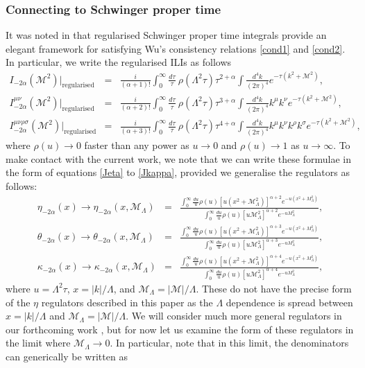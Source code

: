 \documentclass[12pt, letter]{article}
\newcommand{\M}{\mathcal{M}}
\begin{document}
\subsubsection{Connecting to Schwinger proper time} \label{sec:SPT}
It was noted in \cite{Xing:2022jtt} that regularised Schwinger proper time integrals  provide an elegant framework for satisfying Wu's consistency relations \eqref{cond1} and \eqref{cond2}.  In particular, we write the regularised ILIs as follows
\begin{eqnarray}
I_{-2\alpha} (\M^2)|_\text{regularised}&=& \frac{i}{(\alpha+1)!} \int_0^\infty \frac{d\tau}{\tau} \ \rho(\Lambda^2 \tau)  \tau^{2 + \alpha} \int \frac{d^4 k}{(2 \pi)^4}  e^{-\tau (k^2+\M^2)}, \label{ILIs1ST} \\ 
I_{-2 \alpha}^{ \mu \nu} (\M^2) |_\text{regularised}&=& \frac{i}{(\alpha+2)!} \int_0^\infty \frac{d\tau}{\tau} \ \rho(\Lambda^2 \tau)  \tau^{3 + \alpha} \int \frac{d^4 k}{(2 \pi)^4}  k^\mu k^\nu e^{-\tau (k^2+\M^2)}, \label{ILIs2ST} \\ 
I_{-2 \alpha}^{\mu \nu \rho \sigma} (\M^2) |_\text{regularised}&=&  \frac{i}{(\alpha+3)!} \int_0^\infty \frac{d\tau}{\tau} \ \rho(\Lambda^2 \tau)  \tau^{4 + \alpha} \int \frac{d^4 k}{(2 \pi)^4}  k^{\mu}k^{\nu}k^{\rho}k^{\sigma} e^{-\tau (k^2+\M^2)},\quad
 \label{ILIs3ST}
\end{eqnarray}
where  $\rho(u) \to 0$ faster than any power as $u\to 0$ and $\rho(u) \to 1$ as $u \to \infty$. To make contact with the current work, we note that we can write these formulae in the form of equations \eqref{Jeta} to \eqref{Jkappa}, provided we generalise the regulators as follows:
\begin{eqnarray}
\eta_{-2\alpha}(x) \to \eta_{-2\alpha}(x, \M_\Lambda)&=&\frac{\int_0^\infty \frac{du}{u} \rho(u) [u(x^2+\M_\Lambda^2)]^{\alpha+2} e^{-u(x^2+M_\Lambda^2)}}{\int_0^\infty\frac{du}{u} \rho(u) [u\M_\Lambda^2]^{\alpha+2} e^{-u M_\Lambda^2}}, \\
\theta_{-2\alpha}(x) \to \theta_{-2\alpha}(x, \M_\Lambda)&=&\frac{\int_0^\infty \frac{du}{u} \rho(u) [u(x^2+\M_\Lambda^2)]^{\alpha+3} e^{-u(x^2+M_\Lambda^2)}}{\int_0^\infty \frac{du}{u} \rho(u) [u\M_\Lambda^2]^{\alpha+3} e^{-u M_\Lambda^2}}, \\
\kappa_{-2\alpha}(x) \to \kappa_{-2\alpha}(x, \M_\Lambda)&=&\frac{\int_0^\infty \frac{du}{u} \rho(u) [u(x^2+\M_\Lambda^2)]^{\alpha+4} e^{-u(x^2+M_\Lambda^2)}}{\int_0^\infty  \frac{du}{u} \rho(u) [u\M_\Lambda^2]^{\alpha+4} e^{-u M_\Lambda^2}},
\end{eqnarray} 
where $u=\Lambda^2 \tau$,  $x=|k|/\Lambda$, and $\M_\Lambda=|\M|/\Lambda$.  These do not have the precise form of the $\eta$ regulators described in this paper as the $\Lambda$ dependence is spread between  $x=|k|/\Lambda$ and $\M_\Lambda=|\M|/\Lambda$. We will consider much more general regulators in our forthcoming work \cite{PadillaSmith23}, but for now let us examine the form of these regulators in the limit where $\M_\Lambda \to 0$.   In particular, note that in this limit, the denominators can generically be written as 
\end{document}

